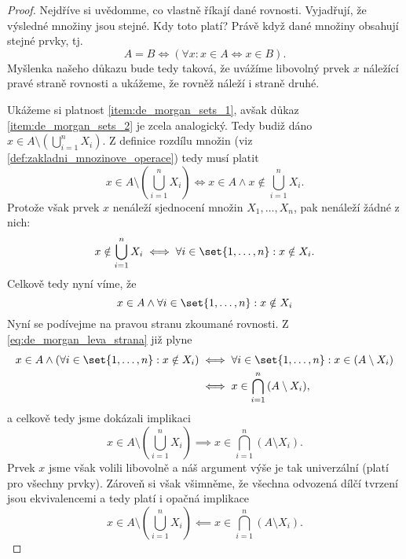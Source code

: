 \begin{proof}
    Nejdříve si uvědomme, co vlastně říkají dané rovnosti. Vyjadřují, že výsledné množiny jsou stejné. Kdy toto platí? Právě když dané množiny obsahují stejné prvky, tj.
    \begin{equation*}
        A=B \iff \left(\forall x : x\in A \iff x\in B\right).     
    \end{equation*}
    Myšlenka našeho důkazu bude tedy taková, že uvážíme libovolný prvek $x$ náležící pravé straně rovnosti a ukážeme, že rovněž náleží i straně druhé.\par
    Ukážeme si platnost \ref{item:de_morgan_sets_1}, avšak důkaz \ref{item:de_morgan_sets_2} je zcela analogický. Tedy budiž dáno $x\in A \setminus \left(\bigcup_{i=1}^{n}{X_i}\right)$. Z definice rozdílu množin (viz \ref{def:zakladni_mnozinove_operace}) tedy musí platit
    \begin{equation*}
        x \in A \setminus \left(\bigcup\limits_{i=1}^{n}{X_i}\right) \iff x\in A \land x\notin \bigcup\limits_{i=1}^{n}{X_i}.
    \end{equation*}
    Protože však prvek $x$ nenáleží sjednocení množin $X_1,\dots,X_n$, pak nenáleží žádné z nich:
    \begin{equation*}
        x\notin \bigcup\limits_{i=1}^{n}{X_i} \iff \forall i\in\set{1,\dots,n} : x\notin X_i.
    \end{equation*}
    Celkově tedy nyní víme, že
    \begin{equation}\label{eq:de_morgan_leva_strana}
        x\in A \land \forall i\in\set{1,\dots,n} : x\notin X_i
    \end{equation}
    Nyní se podívejme na pravou stranu zkoumané rovnosti. Z \eqref{eq:de_morgan_leva_strana} již plyne
    \begin{align*}
        x\in A \land \left(\forall i\in\set{1,\dots,n} : x\notin X_i\right) &\iff \forall i\in\set{1,\dots,n} : x\in (A \setminus X_i)\\
        &\iff x\in\bigcap\limits_{i=1}^{n}{(A \setminus X_i)},
    \end{align*}
    a celkově tedy jsme dokázali implikaci
    \begin{equation*}
        x \in A \setminus \left(\bigcup\limits_{i=1}^{n}{X_i}\right) \implies x\in\bigcap\limits_{i=1}^{n}{(A \setminus X_i)}.
    \end{equation*}
    Prvek $x$ jsme však volili libovolně a náš argument výše je tak univerzální (platí pro všechny prvky). Zároveň si však všimněme, že všechna odvozená dílčí tvrzení jsou ekvivalencemi a tedy platí i opačná implikace
    \begin{equation*}
        x \in A \setminus \left(\bigcup\limits_{i=1}^{n}{X_i}\right) \impliedby x\in\bigcap\limits_{i=1}^{n}{(A \setminus X_i)}.
    \end{equation*}


\end{proof}

